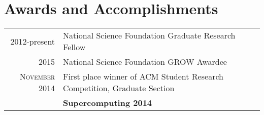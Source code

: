 \documentclass[a4paper,10pt]{article} %
\begin{document}
\section{Awards and Accomplishments}

\begin{longtable}{rl}
\textsc{} 2012-present 
    & National Science Foundation Graduate Research Fellow \normalsize\\

\textsc{} 2015
    & National Science Foundation GROW Awardee\\

\textsc{November} 2014 
    &{First place winner of ACM Student Research Competition, Graduate Section}\\
    &\textbf{Supercomputing 2014} \normalsize\\

\end{longtable}

\end{document}

